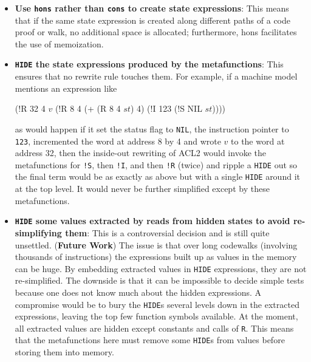 \documentclass[submission,copyright,creativecommons]{eptcs}
\newcommand{\ptt}[1]{\tt{#1}}
\begin{document}
\begin{itemize}
\item {\bf{Use {\ptt{hons}} rather than {\ptt{cons}} to create state expressions}}:
  This means that if the same state expression is created along different paths of
  a code proof or walk, no additional space is allocated; furthermore,
  hons facilitates the use of memoization.

\item {\bf{{\ptt{HIDE}} the state expressions produced by the
    metafunctions}}: This ensures that no rewrite rule touches them.  For
  example, if a machine model mentions an expression like
\begin{acl2p}
(!R 32 4 $v$
    (!R 8 4 (+ (R 8 4 $st$) 4)
        (!I 123
            (!S NIL $st$))))
\end{acl2p}
  as would happen if it set the status flag to {\ptt{NIL}}, the instruction
  pointer to {\ptt{123}}, incremented the word at address 8 by 4 and wrote
  $v$ to the word at address 32, then the inside-out rewriting of ACL2 would
  invoke the metafunctions for {\ptt{!S}}, then {\ptt{!I}}, and then
  {\ptt{!R}} (twice) and ripple a {\ptt{HIDE}} out so the final term would be
  as exactly as above but with a single {\ptt{HIDE}} around it at the top
  level.  It would never be further simplified except by these metafunctions.

\item{\bf{{\ptt{HIDE}} some values extracted by reads from hidden states to
    avoid re-simplifying them}}: This is a controversial decision and is
  still quite unsettled.  ({\bf{Future Work}}) The issue is that over long
  codewalks (involving thousands of instructions) the expressions built up as
  values in the memory can be huge.  By embedding extracted values in
  {\ptt{HIDE}} expressions, they are not re-simplified.  The downside is that
  it can be impossible to decide simple tests because one does not know much
  about the hidden expressions.  A compromise would be to bury the
  {\ptt{HIDE}}s several levels down in the extracted expressions, leaving the
  top few function symbols available.  At the moment, all extracted values
  are hidden except constants and calls of {\ptt{R}}.  This means that the
  metafunctions here must remove some {\ptt{HIDE}}s from values before
  storing them into memory.


\end{itemize}
\end{document}
